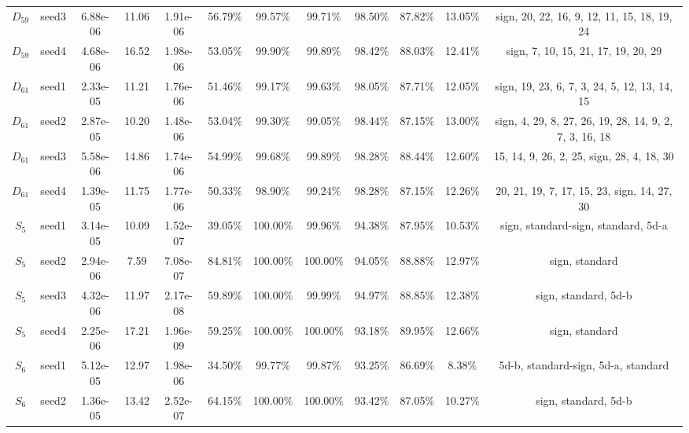 \begin{tabular}{cccccccccccc}
 $D_{59}$ & seed3 &  6.88e-06 &     11.06 &  1.91e-06 &   56.79\% &   99.57\% &   99.71\% &   98.50\% & 87.82\% &            13.05\% &            sign, 20, 22, 16, 9, 12, 11, 15, 18, 19, 24 \\
 $D_{59}$ & seed4 &  4.68e-06 &     16.52 &  1.98e-06 &   53.05\% &   99.90\% &   99.89\% &   98.42\% & 88.03\% &            12.41\% &                    sign, 7, 10, 15, 21, 17, 19, 20, 29 \\
 $D_{61}$ & seed1 &  2.33e-05 &     11.21 &  1.76e-06 &   51.46\% &   99.17\% &   99.63\% &   98.05\% & 87.71\% &            12.05\% &           sign, 19, 23, 6, 7, 3, 24, 5, 12, 13, 14, 15 \\
 $D_{61}$ & seed2 &  2.87e-05 &     10.20 &  1.48e-06 &   53.04\% &   99.30\% &   99.05\% &   98.44\% & 87.15\% &            13.00\% & sign, 4, 29, 8, 27, 26, 19, 28, 14, 9, 2, 7, 3, 16, 18 \\
 $D_{61}$ & seed3 &  5.58e-06 &     14.86 &  1.74e-06 &   54.99\% &   99.68\% &   99.89\% &   98.28\% & 88.44\% &            12.60\% &              15, 14, 9, 26, 2, 25, sign, 28, 4, 18, 30 \\
 $D_{61}$ & seed4 &  1.39e-05 &     11.75 &  1.77e-06 &   50.33\% &   98.90\% &   99.24\% &   98.28\% & 87.15\% &            12.26\% &            20, 21, 19, 7, 17, 15, 23, sign, 14, 27, 30 \\
  $S_{5}$ & seed1 &  3.14e-05 &     10.09 &  1.52e-07 &   39.05\% &  100.00\% &   99.96\% &   94.38\% & 87.95\% &            10.53\% &                    sign, standard-sign, standard, 5d-a \\
  $S_{5}$ & seed2 &  2.94e-06 &      7.59 &  7.08e-07 &   84.81\% &  100.00\% &  100.00\% &   94.05\% & 88.88\% &            12.97\% &                                         sign, standard \\
  $S_{5}$ & seed3 &  4.32e-06 &     11.97 &  2.17e-08 &   59.89\% &  100.00\% &   99.99\% &   94.97\% & 88.85\% &            12.38\% &                                   sign, standard, 5d-b \\
  $S_{5}$ & seed4 &  2.25e-06 &     17.21 &  1.96e-09 &   59.25\% &  100.00\% &  100.00\% &   93.18\% & 89.95\% &            12.66\% &                                         sign, standard \\
  $S_{6}$ & seed1 &  5.12e-05 &     12.97 &  1.98e-06 &   34.50\% &   99.77\% &   99.87\% &   93.25\% & 86.69\% &             8.38\% &                    5d-b, standard-sign, 5d-a, standard \\
  $S_{6}$ & seed2 &  1.36e-05 &     13.42 &  2.52e-07 &   64.15\% &  100.00\% &  100.00\% &   93.42\% & 87.05\% &            10.27\% &                                   sign, standard, 5d-b \\

\end{tabular}
